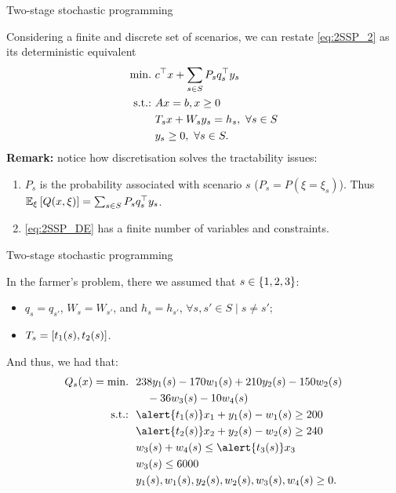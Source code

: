 \begin{frame}{Two-stage stochastic programming}

	Considering a finite and discrete set of scenarios, we can restate \eqref{eq:2SSP_2} as its \alert{deterministic equivalent}
	\begin{subequations} \label{eq:2SSP_DE}
	\begin{align}
		\mathop{\text{min.} \ }  & c^\top x + \sum_{s\in S} P_s q_s^\top y_s \\
		\mathop{\text{s.t.:} \ }	   & Ax = b, x \ge 0 \\
			   & T_sx + W_s y_s = h_s, \ \forall s \in S \\
			   & y_s \ge 0, \ \forall s \in S.
	\end{align}
	\end{subequations}
	\pause 
	{\bf Remark:} notice how discretisation solves the tractability issues:
	\vspace{-6pt}
	\begin{enumerate}
		\item $P_s$ is the probability associated with scenario $s$ ($P_s = P(\xi = \xi_s)$). Thus $\mathbb{E}_\xi\left[ Q(x, \xi) \right] = \sum_{s\in S} P_s q_s^\top y_s$.
		\item \eqref{eq:2SSP_DE} has a \alert{finite} number of variables and constraints.	
	\end{enumerate}


	
\end{frame}


\begin{frame}{Two-stage stochastic programming}
	
	In the farmer's problem, there we assumed that $s \in \left\{ 1,2,3 \right \}$:
		\vspace{-6pt}
		\begin{itemize}
			\item $q_s = q_{s'}$, $W_s = W_{s'}$, and $h_s = h_{s'}$, $\forall s, s' \in S \mid s \neq s'$;
			\item $T_s = \left[ t_1(s), t_2(s) \right]$.  	
		\end{itemize}
	
	\pause
	And thus, we had that:
	\begin{align*}
		Q_s(x) = \mini \ &238y_1(s) -170w_1(s) + 210y_2(s) - 150w_2(s) \\
		& \quad -36w_3(s) -10w_4(s) \\
		\st   \ & \alert{t_1(s)}x_1 + y_1(s) - w_1(s) \geq 200 \\
                & \alert{t_2(s)}x_2 + y_2(s) - w_2(s) \geq 240 \\
                & w_3(s) + w_4(s) \leq \alert{t_3(s)}x_3 \\
                & w_3(s) \leq 6000 \\
                & y_1(s), w_1(s), y_2(s), w_2(s), w_3(s), w_4(s) \geq 0. 
	\end{align*}

	
\end{frame}


